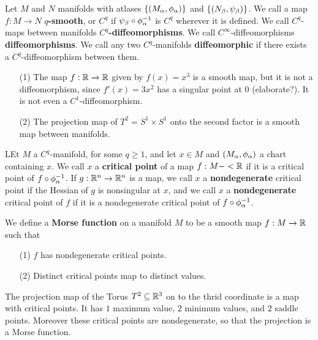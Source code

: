 \begin{definition}
    Let $M$ and $N$ manifolds with atlases  $\{(M_\alpha,\phi_\alpha)\}$ and $\{(N_\beta,
    \psi_\beta)\}$. We call a map $f:M \xrightarrow{} N$ \textbf{$q$-smooth}, or
    $C^q$ if  $\psi_\beta \circ \phi_\alpha^{-1}$ is $C^q$ wherever it is defined. We
    call  $C^q$-maps between manifolds  \textbf{$C^q$-diffeomorphisms}. We call
    $C^\infty$-diffeomorphisms  \textbf{diffeomorphisms}. We call any two
    $C^q$-manifolds  \textbf{diffeomorphic} if there exists a
    $C^q$-diffeomorphism between them.
\end{definition}

\begin{example}\label{example_1.7}
    \begin{enumerate}
        \item[(1)] The map $f:\mathbb{R} \xrightarrow{} \mathbb{R}$ given by $f(x)=x^3$ is a
            smooth map, but it is not a diffeomorphism, since $f'(x)=3x^2$ has a
            singular point at $0$ (elaborate?). It is not even a
            $C^1$-diffeomorphism.

        \item[(2)] The projection map of $T^2=S^1 \times S^1$ onto the second
            factor is a smooth map between manifolds.
    \end{enumerate}
\end{example}

\begin{definition}
    LEt $M$ a  $C^q$-manifold, for some  $q \geq 1$, and let  $x \in M$ and
    $(M_\alpha,\phi_\alpha)$ a chart containing $x$. We call  $x$ a  \textbf{critical
    point} of a map $f:M -< \mathbb{R}$ if it is a critical point of  $f \circ
    \phi_\alpha^{-1}$. If $g:\mathbb{R}^n \xrightarrow{} \mathbb{R}^n$ is a map, we call $x$ a
     \textbf{nondegenerate} critical point if the Hessian of $g$ is nonsingular
     at  $x$, and we call  $x$ a  \textbf{nondegenerate} critical point of $f$
     if it is a nondegenerate critical point of $f \circ \phi_\alpha^{-1}$.
\end{definition}

\begin{definition}
    We define a \textbf{Morse function} on a manifold $M$ to be a smooth map
    $f:M \xrightarrow{} \mathbb{R}$ such that
    \begin{enumerate}
        \item[(1)] $f$ has nondegenerate critical points.

        \item[(2)] Distinct critical points map to distinct values.
    \end{enumerate}
\end{definition}

\begin{example}\label{1.8}
    The projection map of the Torus $T^2 \subseteq \mathbb{R}^3$ on to the thrid
    coordinate is a map with critical points. It has $1$ maximum value,  $2$
    minimum values, and  $2$ saddle points. Moreover these critical points are
    nondegenerate, so that the projection is a Morse function.
\end{example}
